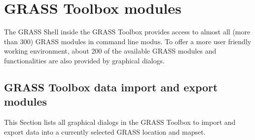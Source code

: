 \chapter{GRASS Toolbox modules}\label{appdx_grass_toolbox_modules}


The GRASS Shell inside the GRASS Toolbox provides access to almost all (more 
than 300) GRASS modules in command line modus. To offer a more user
friendly working environment, about 200 of the available GRASS modules and 
functionalities are also provided by graphical dialogs.

\section{GRASS Toolbox data import and export modules}

This Section lists all graphical dialogs in the GRASS Toolbox to import and
export data into a currently selected GRASS location and mapset.

